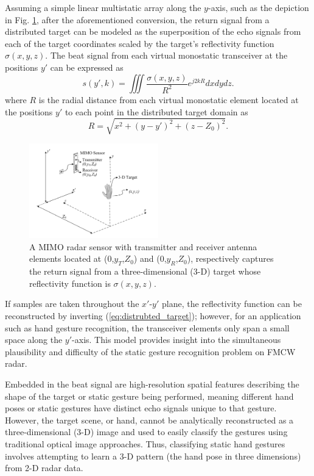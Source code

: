 \documentclass{ieeeaccess}
\begin{document}
Assuming a simple linear multistatic array along the $y$-axis, such as the depiction in Fig. \ref{fig:hand_scenario}, after the aforementioned conversion, the return signal from a distributed target can be modeled as the superposition of the echo signals from each of the target coordinates scaled by the target's reflectivity function $\sigma(x,y,z)$. The beat signal from each virtual monostatic transceiver at the positions $y'$ can be expressed as
\begin{equation}
\label{eq:distrubted_target}
    s(y',k) = \iiint \frac{\sigma(x,y,z)}{R^2}e^{j2kR}dxdydz.
\end{equation}
where $R$ is the radial distance from each virtual monostatic element located at the positions $y'$ to each point in the distributed target domain as 
\begin{equation}
    R = \sqrt{x^2 + (y-y')^2 + (z-Z_0)^2}.
\end{equation}

\begin{figure}[h]
    \centering
    \includegraphics[width=0.5\textwidth]{smith1.png}
    \caption{A MIMO radar sensor with transmitter and receiver antenna elements located at ($0$,$y_T$,$Z_0$) and ($0$,$y_R$,$Z_0$), respectively captures the return signal from a three-dimensional (3-D) target whose reflectivity function is $\sigma(x,y,z)$.}
    \label{fig:hand_scenario}
\end{figure}

If samples are taken throughout the $x'$-$y'$ plane, the reflectivity function can be reconstructed by inverting (\ref{eq:distrubted_target}); however, for an application such as hand gesture recognition, the transceiver elements only span a small space along the $y'$-axis. This model provides insight into the simultaneous plausibility and difficulty of the static gesture recognition problem on FMCW radar. 

Embedded in the beat signal are high-resolution spatial features describing the shape of the target or static gesture being performed, meaning different hand poses or static gestures have distinct echo signals unique to that gesture. However, the target scene, or hand, cannot be analytically reconstructed as a three-dimensional (3-D) image and used to easily classify the gestures using traditional optical image approaches. Thus, classifying static hand gestures involves attempting to learn a 3-D pattern (the hand pose in three dimensions) from 2-D radar data. 
\end{document}
